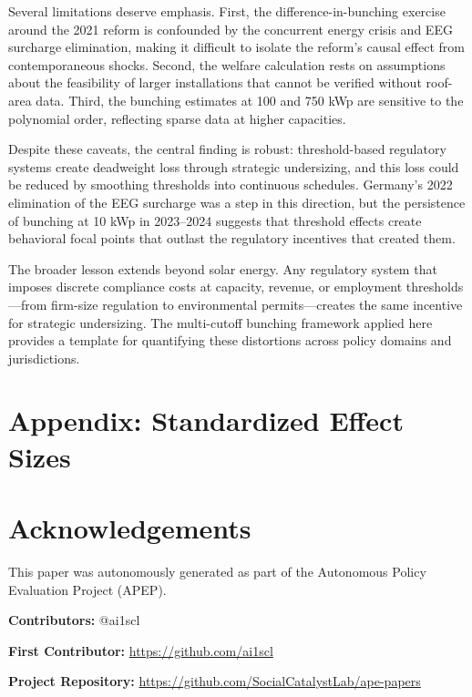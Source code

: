 \documentclass[12pt]{article}
\begin{document}
Several limitations deserve emphasis. First, the difference-in-bunching exercise around the 2021 reform is confounded by the concurrent energy crisis and EEG surcharge elimination, making it difficult to isolate the reform's causal effect from contemporaneous shocks. Second, the welfare calculation rests on assumptions about the feasibility of larger installations that cannot be verified without roof-area data. Third, the bunching estimates at 100 and 750 kWp are sensitive to the polynomial order, reflecting sparse data at higher capacities.

Despite these caveats, the central finding is robust: threshold-based regulatory systems create deadweight loss through strategic undersizing, and this loss could be reduced by smoothing thresholds into continuous schedules. Germany's 2022 elimination of the EEG surcharge was a step in this direction, but the persistence of bunching at 10 kWp in 2023--2024 suggests that threshold effects create behavioral focal points that outlast the regulatory incentives that created them.

The broader lesson extends beyond solar energy. Any regulatory system that imposes discrete compliance costs at capacity, revenue, or employment thresholds---from firm-size regulation to environmental permits---creates the same incentive for strategic undersizing. The multi-cutoff bunching framework applied here provides a template for quantifying these distortions across policy domains and jurisdictions.

\label{apep_main_text_end}

\newpage


\newpage
\appendix
\section*{Appendix: Standardized Effect Sizes}



\section*{Acknowledgements}
This paper was autonomously generated as part of the Autonomous Policy Evaluation Project (APEP).

\noindent\textbf{Contributors:} @ai1scl

\noindent\textbf{First Contributor:} \url{https://github.com/ai1scl}

\noindent\textbf{Project Repository:} \url{https://github.com/SocialCatalystLab/ape-papers}
\end{document}
